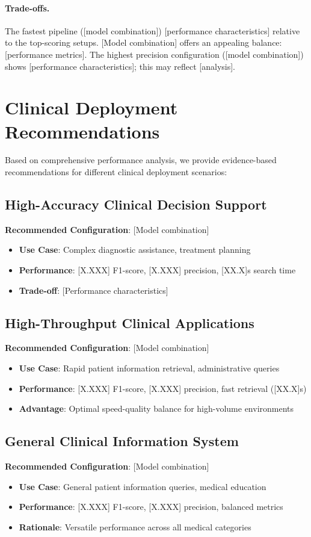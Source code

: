\paragraph{Trade-offs.} The fastest pipeline ([model combination]) [performance characteristics] relative to the top-scoring setups. [Model combination] offers an appealing balance: [performance metrics]. The highest precision configuration ([model combination]) shows [performance characteristics]; this may reflect [analysis].

\section{Clinical Deployment Recommendations}

Based on comprehensive performance analysis, we provide evidence-based recommendations for different clinical deployment scenarios:

\subsection{High-Accuracy Clinical Decision Support}
\textbf{Recommended Configuration}: [Model combination]
\begin{itemize}
    \item \textbf{Use Case}: Complex diagnostic assistance, treatment planning
    \item \textbf{Performance}: [X.XXX] F1-score, [X.XXX] precision, [XX.X]s search time
    \item \textbf{Trade-off}: [Performance characteristics]
\end{itemize}

\subsection{High-Throughput Clinical Applications}
\textbf{Recommended Configuration}: [Model combination]
\begin{itemize}
    \item \textbf{Use Case}: Rapid patient information retrieval, administrative queries
    \item \textbf{Performance}: [X.XXX] F1-score, [X.XXX] precision, fast retrieval ([XX.X]s)
    \item \textbf{Advantage}: Optimal speed-quality balance for high-volume environments
\end{itemize}

\subsection{General Clinical Information System}
\textbf{Recommended Configuration}: [Model combination]
\begin{itemize}
    \item \textbf{Use Case}: General patient information queries, medical education
    \item \textbf{Performance}: [X.XXX] F1-score, [X.XXX] precision, balanced metrics
    \item \textbf{Rationale}: Versatile performance across all medical categories
\end{itemize}

